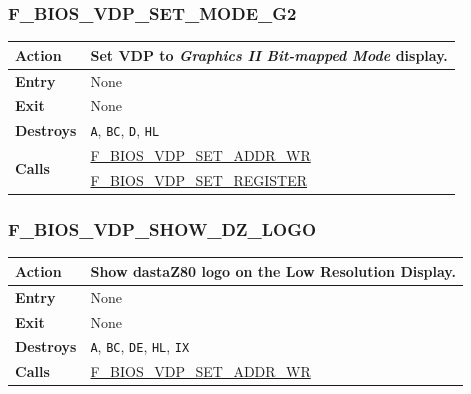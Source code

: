 \documentclass[a4paper,11pt]{article}
\begin{document}
        \subsubsection{F\_BIOS\_VDP\_SET\_MODE\_G2}
        \label{func:fbiosvdpsetmodeg2}
        \begin{tabular}{l p{9cm}}
            \hline\textbf{Action}
            & Set \textbf{VDP} to \textit{Graphics II Bit-mapped Mode} display.\\
            \hline\textbf{Entry} & None\\
            \hline\textbf{Exit} & None\\
            \hline\textbf{Destroys} & \texttt{A}, \texttt{BC}, \texttt{D},
            \texttt{HL} \\
            \hline\multirow[t]{2}{4em}{\textbf{Calls}}
            & \hyperref[func:fbiosvdpsetaddrwr]{F\_BIOS\_VDP\_SET\_ADDR\_WR}\\
            & \hyperref[func:fbiosvdpsetregister]{F\_BIOS\_VDP\_SET\_REGISTER}\\
            \hline
        \end{tabular}

        \subsubsection{F\_BIOS\_VDP\_SHOW\_DZ\_LOGO}
        \label{func:fbiosvdpshowdzlogo}
        \begin{tabular}{l p{9cm}}
            \hline\textbf{Action}
            & Show dastaZ80 logo on the \textbf{Low Resolution Display}.\\
            \hline\textbf{Entry} & None\\
            \hline\textbf{Exit} & None\\
            \hline\textbf{Destroys} & \texttt{A}, \texttt{BC}, \texttt{DE},
            \texttt{HL}, \texttt{IX} \\
            \hline\textbf{Calls} & \hyperref[func:fbiosvdpsetaddrwr]
            {F\_BIOS\_VDP\_SET\_ADDR\_WR}\\
            \hline
        \end{tabular}
\end{document}

